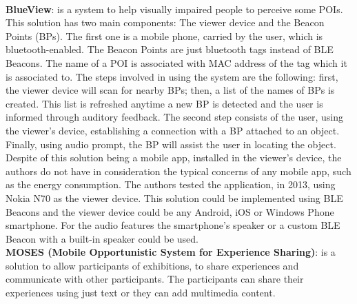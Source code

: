 \\
\textbf{BlueView}\cite{Chen2013}: is a system to help
visually impaired people to perceive some POIs.
This solution has two main components: The viewer device
and the Beacon Points (BPs). The first one is a mobile phone,
carried by the user, which is bluetooth-enabled.
The Beacon Points are just bluetooth tags instead of
BLE Beacons. The name of a POI is associated with
MAC address of the tag which it is associated to.
The steps involved in using the system are the
following: first, the viewer device will scan
for nearby BPs; then, a list of the names of
BPs is created. This list is refreshed anytime a new
BP is detected and the user is informed through auditory
feedback. The second step consists of the user, using
the viewer's device, establishing a connection with a BP
attached to an object. Finally, using audio prompt, the BP
will assist the user in locating the object.
Despite of this solution being a mobile app, installed
in the viewer's device, the authors do not have in
consideration the typical concerns of any mobile app,
such as the energy consumption.
The authors tested the application, in 2013,
using Nokia N70 as the viewer device.
This solution could be implemented using BLE Beacons
and the viewer device could be any Android, iOS or
Windows Phone smartphone.
For the audio features the smartphone's speaker or
a custom BLE Beacon with a built-in speaker could be
used.
\\
\textbf{MOSES
(Mobile Opportunistic System for Experience Sharing)}\cite{BenAbdesslem2014}:
is a solution to allow
participants of exhibitions, to share experiences and
communicate with other participants.
The participants can share their experiences using
just text or they can add multimedia content.

